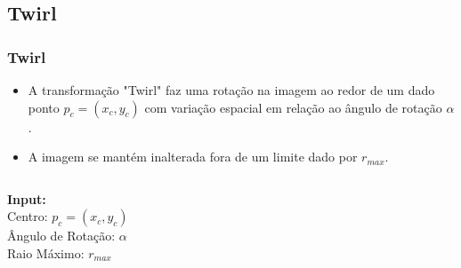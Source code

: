 \documentclass{beamer}
\begin{document}
\subsection{Twirl}
\begin{frame}
\frametitle{Twirl}
\begin{itemize}
 \item A transformação "Twirl" faz uma rotação na imagem ao redor de um dado
ponto $p_c = (x_c, y_c)$ com variação espacial em relação ao ângulo de rotação
$\alpha$.
 \item A imagem se mantém inalterada fora de um limite dado por $r_{max}$.
\end{itemize}

\begin{columns}[c]
\column{1.5in}
\textbf{Input:} \\
Centro: $p_c = (x_c, y_c)$ \\
Ângulo de Rotação: $\alpha$ \\
Raio Máximo: $r_{max}$ 
\column{1.5in}
\end{columns}
\end{frame}
\end{document}
